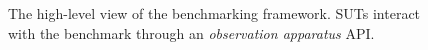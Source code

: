     
    \begin{figure}[h!]
        \begin{center}
            
            \caption{The high-level view of the \gai benchmarking framework. \acs{SUT}s interact with the benchmark through an \textit{observation apparatus} \acs{API}.}
            \label{Figure:gai-framework-overview}
        \end{center}
    \end{figure}

